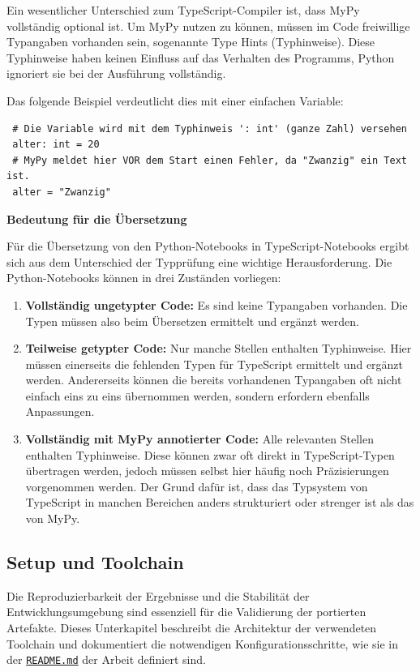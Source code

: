 Ein wesentlicher Unterschied zum TypeScript-Compiler ist, dass MyPy vollständig optional ist.
Um MyPy nutzen zu können, müssen im Code freiwillige Typangaben vorhanden sein, sogenannte Type Hints (Typhinweise).
Diese Typhinweise haben keinen Einfluss auf das Verhalten des Programms, Python ignoriert sie bei der Ausführung vollständig.

Das folgende Beispiel verdeutlicht dies mit einer einfachen Variable:

\begin{verbatim}
 # Die Variable wird mit dem Typhinweis ': int' (ganze Zahl) versehen
 alter: int = 20
 # MyPy meldet hier VOR dem Start einen Fehler, da "Zwanzig" ein Text ist.
 alter = "Zwanzig"
\end{verbatim}


\textbf{Bedeutung für die Übersetzung}

Für die Übersetzung von den Python-Notebooks in TypeScript-Notebooks ergibt sich aus dem Unterschied der Typprüfung eine wichtige Herausforderung.
Die Python-Notebooks können in drei Zuständen vorliegen:

\begin{enumerate}
	\item \textbf{Vollständig ungetypter Code:} Es sind keine Typangaben vorhanden.
	Die Typen müssen also beim Übersetzen ermittelt und ergänzt werden.
	\item \textbf{Teilweise getypter Code:} Nur manche Stellen enthalten Typhinweise.
	Hier müssen einerseits die fehlenden Typen für TypeScript ermittelt und ergänzt werden. Andererseits können die bereits vorhandenen Typangaben oft nicht einfach eins zu eins übernommen werden, sondern erfordern ebenfalls Anpassungen.
	\item \textbf{Vollständig mit MyPy annotierter Code:} Alle relevanten Stellen enthalten Typhinweise.
	Diese können zwar oft direkt in TypeScript-Typen übertragen werden, jedoch müssen selbst hier häufig noch Präzisierungen vorgenommen werden. Der Grund dafür ist, dass das Typsystem von TypeScript in manchen Bereichen anders strukturiert oder strenger ist als das von MyPy.
	
\end{enumerate}

\subsection{Setup und Toolchain}
\label{sec:setup}
Die Reproduzierbarkeit der Ergebnisse und die Stabilität der Entwicklungsumgebung sind essenziell für die Validierung der portierten Artefakte. Dieses Unterkapitel beschreibt die Architektur der verwendeten Toolchain und dokumentiert die notwendigen Konfigurationsschritte, wie sie in der \texttt{\href{https://github.com/zLeoll/TS-Translation-for-TheoInf/blob/main/README.md}{README.md}} der Arbeit definiert sind.

